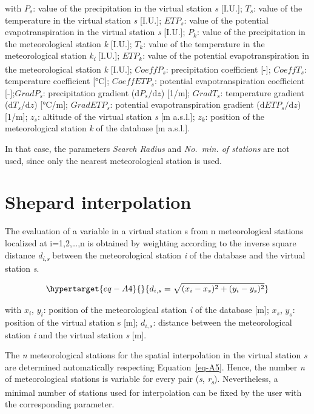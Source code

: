 \documentclass[
  letterpaper,
  DIV=11,
  numbers=noendperiod]{scrreprt}
\begin{document}
with \(P_s\): value of the precipitation in the virtual station \emph{s}
{[}I.U.{]}; \(T_s\): value of the temperature in the virtual station
\emph{s} {[}I.U.{]}; \(ETP_s\): value of the potential
evapotranspiration in the virtual station \emph{s} {[}I.U.{]}; \(P_k\):
value of the precipitation in the meteorological station \emph{k}
{[}I.U.{]}; \(T_k\): value of the temperature in the meteorological
station \emph{k\textsubscript{i}} {[}I.U.{]}; \(ETP_k\): value of the
potential evapotranspiration in the meteorological station \emph{k}
{[}I.U.{]}; \(CoeffP_s\): precipitation coefficient {[}-{]};
\(CoeffT_s\): temperature coefficient {[}°C{]}; \(CoeffETP_s\):
potential evapotranspiration coefficient {[}-{]};\(GradP_s\):
precipitation gradient (\(\mathrm{d}P_s/\mathrm{d}z\)) {[}1/m{]};
\(GradT_s\): temperature gradient (\(\mathrm{d}T_s/\mathrm{d}z\))
{[}°C/m{]}; \(GradETP_s\): potential evapotranspiration gradient
(\(\mathrm{d}ETP_s/\mathrm{d}z\)) {[}1/m{]}; \(z_s\): altitude of the
virtual station \emph{s} {[}m a.s.l.{]}; \(z_k\): position of the
meteorological station \emph{k} of the database {[}m a.s.l.{]}.

In that case, the parameters \emph{Search Radius} and \emph{No.~min. of
stations} are not used, since only the nearest meteorological station is
used.

\hypertarget{shepard-interpolation}{%
\section{Shepard interpolation}\label{shepard-interpolation}}

The evaluation of a variable in a virtual station s from n
meteorological stations localized at i=1,2,\ldots,n is obtained by
weighting according to the inverse square distance
\emph{d\textsubscript{i,s}} between the meteorological station \emph{i}
of the database and the virtual station \emph{s}.

\begin{equation}\protect\hypertarget{eq-A4}{}{
d_{i,s}=\sqrt{(x_i-x_s)^2+(y_i-y_s)^2}
}\label{eq-A4}\end{equation}

with \(x_i\), \(y_i\): position of the meteorological station \emph{i}
of the database {[}m{]}; \(x_s\), \(y_s\): position of the virtual
station s {[}m{]}; \(d_{i,s}\): distance between the meteorological
station \emph{i} and the virtual station \emph{s} {[}m{]}.

The \emph{n} meteorological stations for the spatial interpolation in
the virtual station \emph{s} are determined automatically respecting
Equation~\ref{eq-A5}. Hence, the number \emph{n} of meteorological
stations is variable for every pair (\emph{s},
\emph{r\textsubscript{s}}). Nevertheless, a minimal number of stations
used for interpolation can be fixed by the user with the corresponding
parameter.
\end{document}
